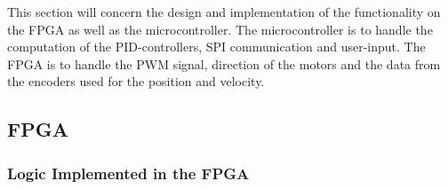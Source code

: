 \documentclass[../../main.tex]{subfiles}
\begin{document}
This section will concern the design and implementation of the functionality on the FPGA as well as the microcontroller. The microcontroller is to handle the computation of the PID-controllers, SPI communication and user-input. The FPGA is to handle the PWM signal, direction of the motors and the data from the encoders used for the position and velocity. 



\subsection{FPGA} \label{subsec:SystemImplemtationFPGA}



\subsubsection*{Logic Implemented in the FPGA}
\end{document}
